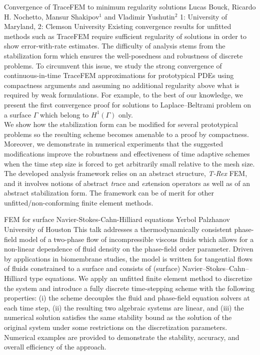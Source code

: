 \vspace{1.5ex}
\abs
{Convergence of TraceFEM to minimum regularity solutions}
{Lucas Bouck, Ricardo H. Nochetto, Mansur Shakipov$^{1}$ and Vladimir Yushutin$^{2}$}
{1: University of Maryland, 2: Clemson University}
{Existing convergence results for unfitted methods such as TraceFEM require sufficient regularity of solutions in order to show error-with-rate estimates. The difficulty of analysis stems from the stabilization form which ensures the well-posedness and robustness of discrete problems. To circumvent this issue, we study the strong convergence of continuous-in-time TraceFEM approximations for prototypical PDEs using compactness arguments and  assuming no additional regularity above what is required by weak formulations. For example, to the best of our knowledge, we present the first convergence proof for solutions to Laplace--Beltrami problem on a surface $\Gamma$ which belong to $H^1(\Gamma)$ only.\\
We show how the stabilization form can be modified for several prototypical problems so the resulting scheme becomes amenable to a proof by compactness. Moreover, we demonstrate in numerical experiments that the suggested modifications improve  the robustness and effectiveness of time adaptive schemes when the time step size is forced to get arbitrarily small relative to the mesh size.\\
The developed analysis framework relies on an abstract structure,  \textit{T-Rex} FEM, and it
involves notions of abstract \textit{tr}ace  and \textit{ex}tension operators as well as of an abstract
stabilization form. The framework can be of merit for other unfitted/non-conforming finite
element methods.}


\vspace{1.5ex}
\abs
{FEM for surface Navier-Stokes-Cahn-Hilliard equations}
{Yerbol Palzhanov}
{University of Houston}
{This talk addresses a thermodynamically consistent phase-field model of a two-phase flow of incompressible viscous fluids which allows for a non-linear dependence of fluid density on the
phase-field order parameter. Driven by applications in biomembrane studies, the model is written for
tangential flows of fluids constrained to a surface and consists of (surface) Navier–Stokes–Cahn–Hilliard
type equations. We apply an unfitted finite element method to discretize the system and introduce a
fully discrete time-stepping scheme with the following properties: (i) the scheme decouples the fluid
and phase-field equation solvers at each time step, (ii) the resulting two algebraic systems are linear,
and (iii) the numerical solution satisfies the same stability bound as the solution of the original system
under some restrictions on the discretization parameters. Numerical examples are provided to demonstrate the stability, accuracy, and overall efficiency of the approach.}


